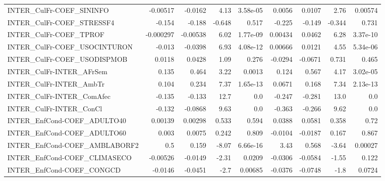 \begin{tabular}{lrrrrrrrr}
INTER\_CulFr-COEF\_SININFO               &    -0.00517 &      -0.0162 &     4.13 & 3.58e-05 &     0.0056 &      0.0107 &         2.76 &       0.00574 \\
INTER\_CulFr-COEF\_STRESSF4              &      -0.154 &       -0.188 &   -0.648 &    0.517 &     -0.225 &      -0.149 &       -0.344 &         0.731 \\
INTER\_CulFr-COEF\_TPROF                 &   -0.000297 &     -0.00538 &     6.02 & 1.77e-09 &    0.00434 &      0.0462 &         6.28 &      3.37e-10 \\
INTER\_CulFr-COEF\_USOCINTURON           &      -0.013 &      -0.0398 &     6.93 & 4.08e-12 &    0.00666 &      0.0121 &         4.55 &      5.34e-06 \\
INTER\_CulFr-COEF\_USODISPMOB            &      0.0118 &       0.0428 &     1.09 &    0.276 &    -0.0294 &     -0.0671 &        0.731 &         0.465 \\
INTER\_CulFr-INTER\_AFrSem               &       0.135 &        0.464 &     3.22 &   0.0013 &      0.124 &       0.567 &         4.17 &      3.02e-05 \\
INTER\_CulFr-INTER\_AmbTr                &       0.104 &        0.234 &     7.37 & 1.65e-13 &     0.0671 &       0.168 &         7.34 &      2.13e-13 \\
INTER\_CulFr-INTER\_ComAfec              &      -0.135 &       -0.133 &     12.7 &      0.0 &     -0.247 &      -0.281 &         13.0 &           0.0 \\
INTER\_CulFr-INTER\_ConCl                &      -0.132 &      -0.0868 &     9.63 &      0.0 &     -0.363 &      -0.266 &         9.62 &           0.0 \\
INTER\_EnfCond-COEF\_ADULTO40            &     0.00139 &      0.00298 &    0.533 &    0.594 &     0.0388 &      0.0581 &        0.358 &          0.72 \\
INTER\_EnfCond-COEF\_ADULTO60            &       0.003 &       0.0075 &    0.242 &    0.809 &    -0.0104 &     -0.0187 &        0.167 &         0.867 \\
INTER\_EnfCond-COEF\_AMBLABORF2          &         0.5 &        0.159 &    -8.07 & 6.66e-16 &       3.43 &       0.568 &        -3.64 &       0.00027 \\
INTER\_EnfCond-COEF\_CLIMASECO           &    -0.00526 &      -0.0149 &    -2.31 &   0.0209 &    -0.0306 &     -0.0584 &        -1.55 &         0.122 \\
INTER\_EnfCond-COEF\_CONGCD              &     -0.0146 &      -0.0451 &     -2.7 &  0.00685 &    -0.0376 &     -0.0748 &         -1.8 &        0.0724 \\

\end{tabular}
